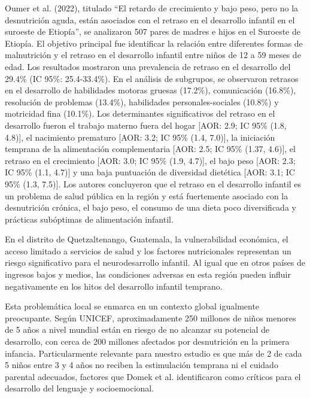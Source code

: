 \documentclass[11pt,letterpaper]{report}
\begin{document}
Oumer et al. (2022), titulado “El retardo de crecimiento y bajo peso, pero no
la desnutrición aguda, están asociados con el retraso en el desarrollo
infantil en el suroeste de Etiopía”, se analizaron 507 pares de madres e hijos
en el Suroeste de Etiopía. El objetivo principal fue identificar la relación
entre diferentes formas de malnutrición y el retraso en el desarrollo infantil
entre niños de 12 a 59 meses de edad. Los resultados mostraron una prevalencia
de retraso en el desarrollo del 29.4\% (IC 95\%: 25.4-33.4\%). En el análisis
de subgrupos, se observaron retrasos en el desarrollo de habilidades motoras
gruesas (17.2\%), comunicación (16.8\%), resolución de problemas (13.4\%),
habilidades personales-sociales (10.8\%) y motricidad fina (10.1\%).
Los determinantes significativos del retraso en el desarrollo fueron el trabajo
materno fuera del hogar [AOR: 2.9; IC 95\% (1.8, 4.8)], el nacimiento prematuro
[AOR: 3.2; IC 95\% (1.4, 7.0)], la iniciación temprana de la alimentación
complementaria [AOR: 2.5; IC 95\% (1.37, 4.6)], el retraso en el crecimiento
[AOR: 3.0; IC 95\% (1.9, 4.7)], el bajo peso [AOR: 2.3; IC 95\% (1.1, 4.7)] y
una baja puntuación de diversidad dietética [AOR: 3.1; IC 95\% (1.3, 7.5)].
Los autores concluyeron que el retraso en el desarrollo infantil es un problema
de salud pública en la región y está fuertemente asociado con la desnutrición
crónica, el bajo peso, el consumo de una dieta poco diversificada y prácticas
subóptimas de alimentación infantil.
\cite{Oumer2022}

En el distrito de Quetzaltenango, Guatemala, la vulnerabilidad económica, el
acceso limitado a servicios de salud y los factores nutricionales representan
un riesgo significativo para el neurodesarrollo infantil. Al igual que en otros
países de ingresos bajos y medios, las condiciones adversas en esta región
pueden influir negativamente en los hitos del desarrollo infantil temprano.

Esta problemática local se enmarca en un contexto global igualmente 
preocupante. Según UNICEF\cite{UNICEF2023}, aproximadamente 250 millones de 
niños menores de 5 años a nivel mundial están en riesgo de no alcanzar su 
potencial de desarrollo, con cerca de 200 millones afectados por desnutrición 
en la primera infancia. Particularmente relevante para nuestro estudio es que 
más de 2 de cada 5 niños entre 3 y 4 años no reciben la estimulación temprana 
ni el cuidado parental adecuados, factores que Domek et al.\cite{Domek2023} 
identificaron como críticos para el desarrollo del lenguaje y socioemocional. 
\end{document}
